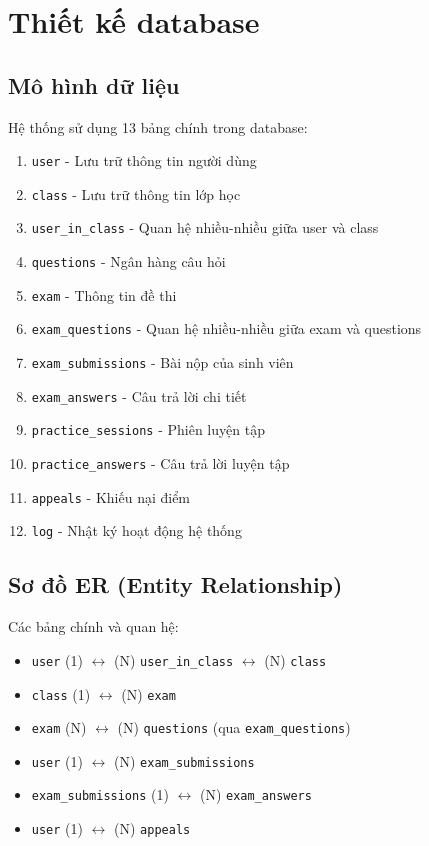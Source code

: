 ﻿\documentclass[12pt,a4paper]{report}
\begin{document}
\section{Thiết kế database}

\subsection{Mô hình dữ liệu}

Hệ thống sử dụng 13 bảng chính trong database:

\begin{enumerate}
    \item \texttt{user} - Lưu trữ thông tin người dùng
    \item \texttt{class} - Lưu trữ thông tin lớp học
    \item \texttt{user\_in\_class} - Quan hệ nhiều-nhiều giữa user và class
    \item \texttt{questions} - Ngân hàng câu hỏi
    \item \texttt{exam} - Thông tin đề thi
    \item \texttt{exam\_questions} - Quan hệ nhiều-nhiều giữa exam và questions
    \item \texttt{exam\_submissions} - Bài nộp của sinh viên
    \item \texttt{exam\_answers} - Câu trả lời chi tiết
    \item \texttt{practice\_sessions} - Phiên luyện tập
    \item \texttt{practice\_answers} - Câu trả lời luyện tập
    \item \texttt{appeals} - Khiếu nại điểm
    \item \texttt{log} - Nhật ký hoạt động hệ thống
\end{enumerate}

\subsection{Sơ đồ ER (Entity Relationship)}

Các bảng chính và quan hệ:

\begin{itemize}
    \item \texttt{user} (1) $\leftrightarrow$ (N) \texttt{user\_in\_class} $\leftrightarrow$ (N) \texttt{class}
    \item \texttt{class} (1) $\leftrightarrow$ (N) \texttt{exam}
    \item \texttt{exam} (N) $\leftrightarrow$ (N) \texttt{questions} (qua \texttt{exam\_questions})
    \item \texttt{user} (1) $\leftrightarrow$ (N) \texttt{exam\_submissions}
    \item \texttt{exam\_submissions} (1) $\leftrightarrow$ (N) \texttt{exam\_answers}
    \item \texttt{user} (1) $\leftrightarrow$ (N) \texttt{appeals}
\end{itemize}
\end{document}
